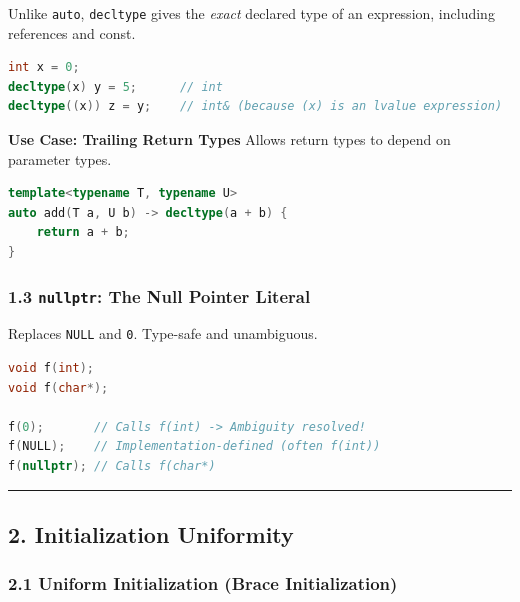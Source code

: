 Unlike \passthrough{\lstinline!auto!},
\passthrough{\lstinline!decltype!} gives the \emph{exact} declared type
of an expression, including references and const.

\begin{lstlisting}[language={C++}]
int x = 0;
decltype(x) y = 5;      // int
decltype((x)) z = y;    // int& (because (x) is an lvalue expression)
\end{lstlisting}

\textbf{Use Case: Trailing Return Types} Allows return types to depend
on parameter types.

\begin{lstlisting}[language={C++}]
template<typename T, typename U>
auto add(T a, U b) -> decltype(a + b) {
    return a + b;
}
\end{lstlisting}

\hypertarget{nullptr-the-null-pointer-literal}{%
\subsubsection{\texorpdfstring{1.3 \texttt{nullptr}: The Null Pointer
Literal}{1.3 nullptr: The Null Pointer Literal}}\label{nullptr-the-null-pointer-literal}}

Replaces \passthrough{\lstinline!NULL!} and \passthrough{\lstinline!0!}.
Type-safe and unambiguous.

\begin{lstlisting}[language={C++}]
void f(int);
void f(char*);

f(0);       // Calls f(int) -> Ambiguity resolved!
f(NULL);    // Implementation-defined (often f(int))
f(nullptr); // Calls f(char*)
\end{lstlisting}

\begin{center}\rule{0.5\linewidth}{0.5pt}\end{center}

\hypertarget{initialization-uniformity}{%
\subsection{2. Initialization
Uniformity}\label{initialization-uniformity}}

\hypertarget{uniform-initialization-brace-initialization}{%
\subsubsection{2.1 Uniform Initialization (Brace
Initialization)}\label{uniform-initialization-brace-initialization}}

